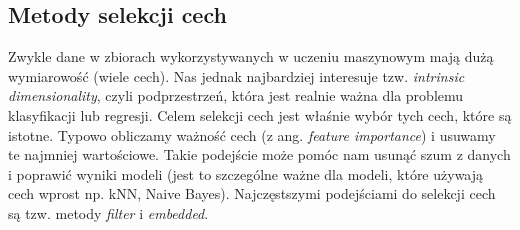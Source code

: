\documentclass{myclass}
\numberwithin{equation}{subsection}
\begin{document}
\subsection{Metody selekcji cech}

Zwykle dane w zbiorach wykorzystywanych w uczeniu maszynowym mają dużą wymiarowość (wiele cech). Nas
jednak najbardziej interesuje tzw. \textit{intrinsic dimensionality}, czyli podprzestrzeń, która
jest realnie ważna dla problemu klasyfikacji lub regresji. Celem selekcji cech jest właśnie wybór
tych cech, które są istotne. Typowo obliczamy ważność cech (z ang. \textit{feature importance}) i
usuwamy te najmniej wartościowe. Takie podejście może pomóc nam usunąć szum z danych i poprawić
wyniki modeli (jest to szczególne ważne dla modeli, które używają cech wprost np. kNN, Naive Bayes).
Najczęstszymi podejściami do selekcji cech są tzw. metody \textit{filter} i \textit{embedded}.
\end{document}
